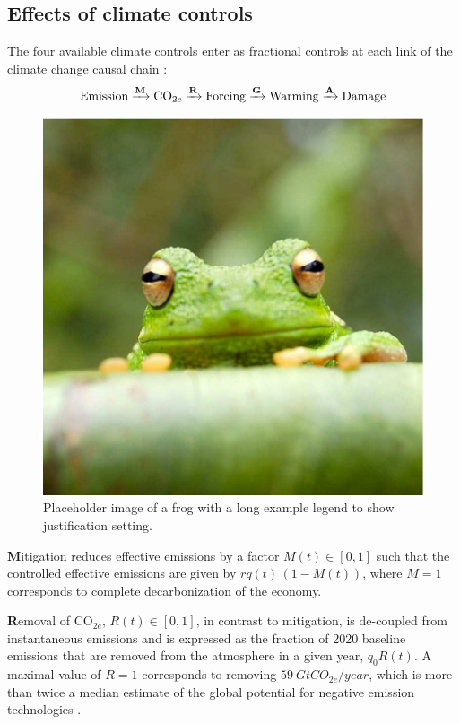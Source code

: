 \documentclass[9pt,twocolumn,twoside,lineno]{pnas-new}
\begin{document}
\subsection*{Effects of climate controls}

The four available climate controls enter as fractional controls at each link of the climate change causal chain \cite[similar to][]{moreno}:
\begin{equation}
    \text{Emission}
    \xrightarrow{\text{\textbf{M}}}
    \text{CO$_{2e}$}
    \xrightarrow{\text{\textbf{R}}}
    \text{Forcing}
    \xrightarrow{\text{\textbf{G}}}
    \text{Warming}
    \xrightarrow{\text{\textbf{A}}}
    \text{Damage}
\end{equation}

\begin{figure}%
\centering
\includegraphics[width=.8\linewidth]{frog}
\caption{Placeholder image of a frog with a long example legend to show justification setting.}
\label{fig:frog}
\end{figure}

\textbf{M}itigation reduces effective emissions by a factor $M(t) \in [0,1]$ such that the controlled effective emissions are given by $rq(t)\,(1-M(t))$, where $M = 1$ corresponds to complete decarbonization of the economy.

\textbf{R}emoval of CO$_{2e}$, $R(t) \in [0,1]$, in contrast to mitigation, is de-coupled from instantaneous emissions and is expressed as the fraction of 2020 baseline emissions that are removed from the atmosphere in a given year, $q_{0}R(t)$. A maximal value of $R=1$ corresponds to removing $\SI{59}{GtCO_{2e} / year}$, which is more than twice a median estimate of the global potential for negative emission technologies \cite{fuss_negative_2018}.
\end{document}
